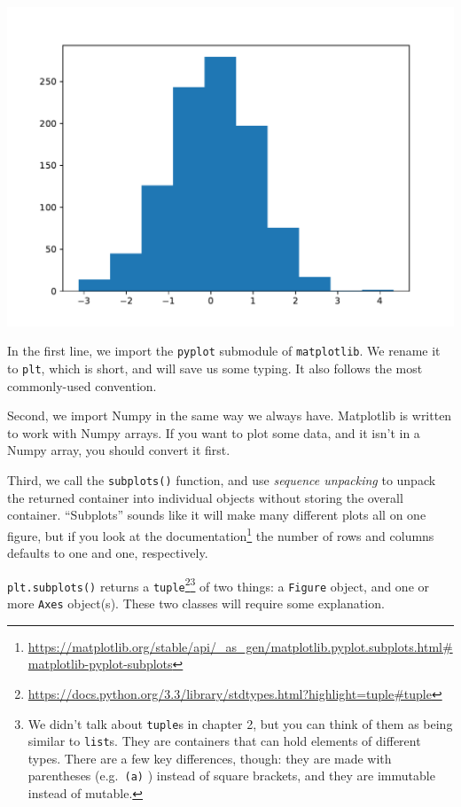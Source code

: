 \documentclass[
  12pt,
]{krantz}
\renewcommand{\href}[2]{#2\footnote{\url{#1}}}
\begin{document}
\includegraphics[width=0.8\linewidth]{r_and_python_book_files/figure-latex/unnamed-chunk-177-1}

In the first line, we import the \texttt{pyplot} submodule of \texttt{matplotlib}. We rename it to \texttt{plt}, which is short, and will save us some typing. It also follows the most commonly-used convention.

Second, we import Numpy in the same way we always have. Matplotlib is written to work with Numpy arrays. If you want to plot some data, and it isn't in a Numpy array, you should convert it first.

Third, we call the \texttt{subplots()} function, and use \emph{sequence unpacking} to unpack the returned container into individual objects without storing the overall container. ``Subplots'' sounds like it will make many different plots all on one figure, but if you look at the \href{https://matplotlib.org/stable/api/_as_gen/matplotlib.pyplot.subplots.html\#matplotlib-pyplot-subplots}{documentation} the number of rows and columns defaults to one and one, respectively.

\texttt{plt.subplots()} returns a \href{https://docs.python.org/3.3/library/stdtypes.html?highlight=tuple\#tuple}{\texttt{tuple}}\footnote{We didn't talk about \texttt{tuple}s in chapter 2, but you can think of them as being similar to \texttt{list}s. They are containers that can hold elements of different types. There are a few key differences, though: they are made with parentheses (e.g.~\texttt{(\textquotesingle{}a\textquotesingle{})} ) instead of square brackets, and they are immutable instead of mutable.} of two things: a \texttt{Figure} object, and one or more \texttt{Axes} object(s). These two classes will require some explanation.
\end{document}
